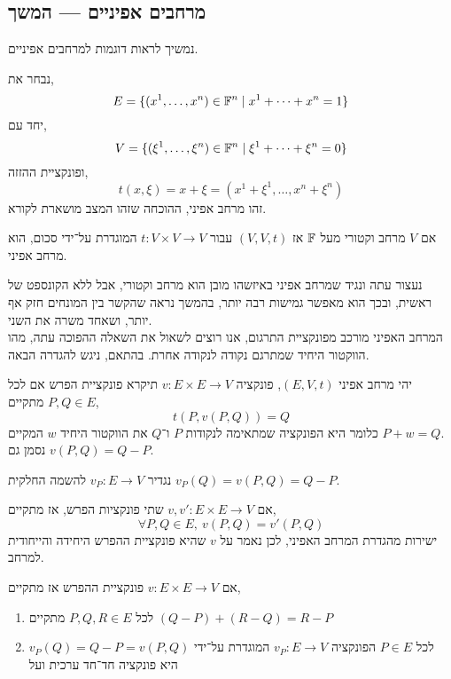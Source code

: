 \subsection{מרחבים אפיניים --- המשך}
נמשיך לראות דוגמות למרחבים אפיניים.
\begin{example}
	נבחר את,
	\[
		E = \{ (x^1, \ldots, x^n) \in \mathbb{F}^n \mid x^1 + \cdots + x^n = 1 \}
	\]
	יחד עם,
	\[
		V = \{ (\xi^1, \ldots, \xi^n) \in \mathbb{F}^n \mid \xi^1 + \cdots + \xi^n = 0 \}
	\]
	ופונקציית ההזזה,
	\[
		t(x, \xi)
		= x + \xi
		= (x^1 + \xi^1, \ldots, x^n + \xi^n)
	\]
	זהו מרחב אפיני, ההוכחה שזהו המצב מושארת לקורא.
\end{example}
\begin{example}
	אם $V$ מרחב וקטורי מעל $\mathbb{F}$ אז $(V, V, t)$ עבור $t : V \times V \to V$ המוגדרת על־ידי סכום, הוא מרחב אפיני.
\end{example}
נעצור עתה ונגיד שמרחב אפיני באיזשהו מובן הוא מרחב וקטורי, אבל ללא הקונספט של ראשית, ובכך הוא מאפשר גמישות רבה יותר, בהמשך נראה שהקשר בין המונחים חזק אף יותר, ושאחד משרה את השני. \\
המרחב האפיני מורכב מפונקציית התרגום, אנו רוצים לשאול את השאלה ההפוכה עתה, מהו הווקטור היחיד שמתרגם נקודה לנקודה אחרת.
בהתאם, ניגש להגדרה הבאה.
\begin{definition}
	יהי מרחב אפיני $(E, V, t)$, פונקציה $v : E \times E \to V$ תיקרא פונקציית הפרש אם לכל $P, Q \in E$ מתקיים,
	\[
		t(P, v(P, Q)) = Q
	\]
	כלומר היא הפונקציה שמתאימה לנקודות $P$ ו־$Q$ את הווקטור היחיד $w$ המקיים $P + w = Q$. \\
	נסמן גם $v(P, Q) = Q - P$.
\end{definition}
\begin{notation}
	נגדיר $v_P : E \to V$ להשמה החלקית $v_P(Q) = v(P, Q) = Q - P$.
\end{notation}
\begin{remark}
	אם $v, v' : E \times E \to V$ שתי פונקציות הפרש, אז מתקיים,
	\[
		\forall P, Q \in E,\ v(P, Q) = v'(P, Q)
	\]
	ישירות מהגדרת המרחב האפיני, לכן נאמר על $v$ שהיא פונקציית ההפרש היחידה והייחודית למרחב.
\end{remark}
\begin{proposition}
	אם $v : E \times E \to V$ פונקציית ההפרש אז מתקיים,
	\begin{enumerate}
		\item לכל $P, Q, R \in E$ מתקיים $(Q - P) + (R - Q) = R - P$
		\item לכל $P \in E$ הפונקציה $v_P : E \to V$ המוגדרת על־ידי $v_P(Q) = Q - P = v(P, Q)$ היא פונקציה חד־חד ערכית ועל
	\end{enumerate}
\end{proposition}
